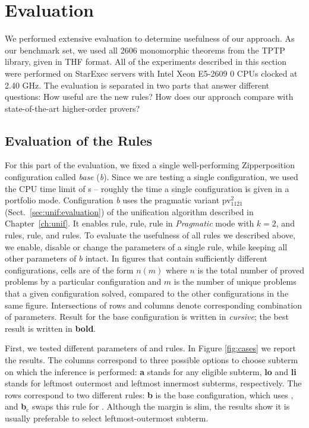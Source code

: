 \section{Evaluation} 
\label{sect:bool:eval}

We performed extensive evaluation to determine usefulness of our approach. As
our benchmark set, we used all 2606 monomorphic theorems from the TPTP library,
given in THF format. All of the experiments described in this section were
performed on StarExec \cite{sst-14-starexec} servers with Intel Xeon E5-2609 0 CPUs clocked at 2.40 GHz. The evaluation is separated in two parts that
answer different questions: How useful are the new rules? How 
does our approach compare with state-of-the-art higher-order provers?

\subsection{Evaluation of the Rules}

For this part of the evaluation, we fixed a single well-performing Zipperposition configuration
called \emph{base} (\emph{b}). Since we are testing a single configuration, we
used the CPU time limit of  s -- roughly the time a single configuration is
given in a portfolio mode. Configuration \emph{b} uses the pragmatic variant
pv$_{1121}^{2}$ (Sect.~\ref{sec:unif:evaluation}) of the unification algorithm described in Chapter~\ref{ch:unif}. 
It enables  rule,
 rule,  rule in \emph{Pragmatic} mode with $k=2$,
 and  rules,  rule, and  rules. 
To evaluate the usefulness of
all rules we described above, we enable, disable or change the
parameters of a single rule, while keeping all other parameters of $b$ intact. 
In figures that contain sufficiently different configurations, cells are of the form $n (m)$ where $n$ is the total
number of proved problems by a particular configuration and $m$ is the number of
unique problems that a given configuration solved, compared to the other
configurations in the same figure. Intersections of rows and columns
denote corresponding combination of parameters.
Result for the base configuration is written in \emph{cursive}; the best result
is written in \textbf{bold}.

First, we tested different parameters of  and 
rules. In Figure \ref{fig:cases} we report the results. The columns correspond to
three possible options to choose subterm on which the inference is performed:
\textbf{a} stands for any eligible subterm, \textbf{lo} and \textbf{li} stands
for leftmost outermost and leftmost innermost subterms, respectively. The rows
correspond to two different rules: 
\textbf{b} is the base configuration, which uses , and \textbf{b$_\text{c}$}
swaps this rule for . Although the margin is slim, the results show it is usually preferable to select leftmost-outermost
subterm.


